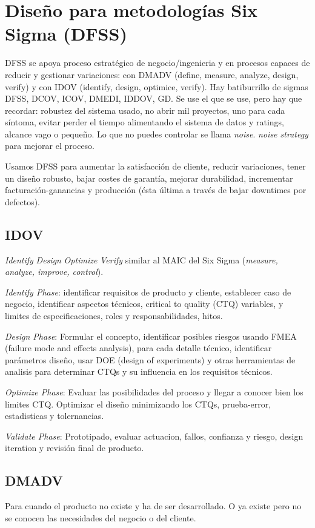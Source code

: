 \documentclass[]{article}
\begin{document}
\section{Diseño para metodologías Six Sigma (DFSS)}

DFSS se apoya proceso estratégico de negocio/ingenieria y en procesos capaces de reducir y gestionar variaciones: con DMADV (define, measure, analyze, design, verify) y con IDOV (identify, design, optimice, verify). Hay batiburrillo de sigmas DFSS, DCOV, ICOV, DMEDI, IDDOV, GD. Se use el que se use, pero hay que recordar: robustez del sistema usado, no abrir mil proyectos, uno para cada síntoma, evitar perder el tiempo alimentando el sistema de datos y ratings, alcance vago o pequeño. Lo que no puedes controlar se llama \textit{noise}. \textit{noise strategy} para mejorar el proceso.

Usamos DFSS para aumentar la satisfacción de cliente, reducir variaciones, tener un diseño robusto, bajar costes de garantía, mejorar durabilidad, incrementar facturación-ganancias y producción (ésta última a través de bajar downtimes por defectos).

\subsection{IDOV} \textit{Identify} \textit{Design} \textit{Optimize} \textit{Verify} similar al MAIC del Six Sigma (\textit{measure, analyze, improve, control}).

\textit{Identify Phase}: identificar requisitos de producto y cliente, establecer caso de negocio, identificar aspectos técnicos, critical to quality (CTQ) variables, y limites de especificaciones, roles y responsabilidades, hitos.

\textit{Design Phase}: Formular el concepto, identificar posibles riesgos usando FMEA (failure mode and effects analysis), para cada detalle técnico, identificar parámetros diseño, usar DOE (design of experiments) y otras herramientas de analisis para determinar CTQs y su influencia en los requisitos técnicos.

\textit{Optimize Phase}: Evaluar las posibilidades del proceso y llegar a conocer bien los limites CTQ. Optimizar el diseño minimizando los CTQs, prueba-error, estadisticas y tolernancias.

\textit{Validate Phase}: Prototipado, evaluar actuacion, fallos, confianza y riesgo, design iteration y revisión final de producto.

\subsection{DMADV} Para cuando el producto no existe y ha de ser desarrollado. O ya existe pero no se conocen las necesidades del negocio o del cliente. 
\end{document}
